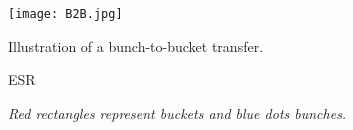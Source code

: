 %
%
%
\begin{figure}[H]
   \centering   
   \texttt{[image: B2B.jpg]}
   \caption{Illustration of a bunch-to-bucket transfer.}
	\caption*{\textsl{\small{Red rectangles represent buckets and blue dots bunches.}}}ESR

   \label{B2B}
\end{figure}

